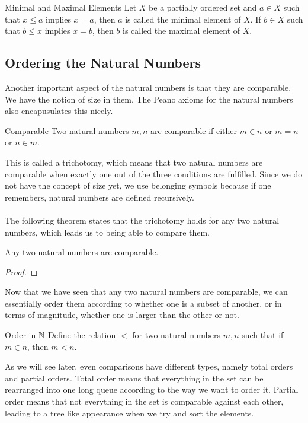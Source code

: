 \documentclass[a4paper]{article}
\begin{document}
\begin{defn}{Minimal and Maximal Elements}{} Let $X$ be a partially ordered set and $a\in X$ such that $x\leq a$ implies $x=a$, then $a$ is called the minimal element of $X$. If $b\in X$ such that $b\leq x$ implies $x=b$, then $b$ is called the maximal element of $X$. 
\end{defn}

\subsection{Ordering the Natural Numbers}
Another important aspect of the natural numbers is that they are comparable. We have the notion of size in them. The Peano axioms for the natural numbers also encapusulates this nicely. 

\begin{defn}{Comparable}{} Two natural numbers $m,n$ are comparable if either $m\in n$ or $m=n$ or $n\in m$. 
\end{defn}

This is called a trichotomy, which means that two natural numbers are comparable when exactly one out of the three conditions are fulfilled. Since we do not have the concept of size yet, we use belonging symbols because if one remembers, natural numbers are defined recursively. \\~\\
The following theorem states that the trichotomy holds for any two natural numbers, which leads us to being able to compare them. 

\begin{thm}{}{} Any two natural numbers are comparable. \tcbline
\begin{proof}
\end{proof}
\end{thm}

Now that we have seen that any two natural numbers are comparable, we can essentially order them according to whether one is a subset of another, or in terms of magnitude, whether one is larger than the other or not. 

\begin{defn}{Order in $\mathbb{N}$}{} Define the relation $<$ for two natural numbers $m,n$ such that if $m\in n$, then $m<n$. 
\end{defn}

As we will see later, even comparisons have different types, namely total orders and partial orders. Total order means that everything in the set can be rearranged into one long queue according to the way we want to order it. Partial order means that not everything in the set is comparable against each other, leading to a tree like appearance when we try and sort the elements. 
\end{document}
